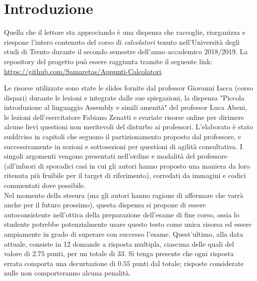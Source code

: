 \documentclass[class=book, crop=false, oneside]{standalone}
\begin{document}
\chapter*{Introduzione}

Quella che il lettore sta approciando è una dispensa che raccoglie, riorganizza e riespone l'intero contenuto del corso di \emph{calcolatori} tenuto nell'Università degli studi di Trento durante il secondo semestre dell'anno accademico 2018/2019. La repository del progetto può essere raggiunta tramite il seguente link: \url{https://github.com/Samaretas/Appunti-Calcolatori}.

Le risorse utilizzate sono state le slides fornite dal professor Giovanni Iacca (corso dispari) durante le lezioni e integrate dalle sue spiegazioni, la dispensa "Piccola introduzione al linguaggio Assembly e simili amenità" del professor Luca Abeni, le lezioni dell'esercitatore Fabiano Zenatti e svariate risorse online per dirimere alcune lievi questioni non meritevoli del disturbo ai professori. L'elaborato è stato suddiviso in capitoli che seguono il partizionamento proposto dal professore, e successivamente in sezioni e sottosezioni per questioni di agilità consultativa. I singoli argomenti vengono presentati nell'ordine e modalità del professore (all'infuori di sporadici casi in cui gli autori hanno proposto una maniera da loro ritenuta più fruibile per il target di riferimento), corredati da immagini e codici commentati dove possibile.\\

Nel momento della stesura (ma gli autori hanno ragione di affermare che varrà anche per il futuro prossimo), questa dispensa si propone di essere autoconsistente nell'ottica della preparazione dell'esame di fine corso, ossia lo studente potrebbe potenzialmente usare questo testo come unica risorsa ed essere ampiamente in grado di superare con successo l'esame. Quest'ultimo, alla data attuale, consiste in 12 domande a risposta multipla, ciascuna delle quali del valore di \(2.75\) punti, per un totale di \(33\). Si tenga presente che ogni risposta errata comporta una decurtazione di \(0.55\) punti dal totale; risposte considerate nulle non comporteranno alcuna penalità.\\
\end{document}
